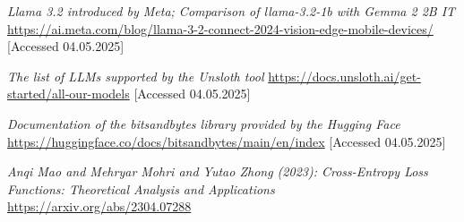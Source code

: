 \documentclass[licencjacka,en]{pracamgr}
\begin{document}
\begin{thebibliography}{99}
\textit{Llama 3.2 introduced by Meta; Comparison of llama-3.2-1b with Gemma 2 2B IT}
\url{https://ai.meta.com/blog/llama-3-2-connect-2024-vision-edge-mobile-devices/}
[Accessed 04.05.2025]

\textit{The list of LLMs supported by the Unsloth tool}
\url{https://docs.unsloth.ai/get-started/all-our-models}
[Accessed 04.05.2025]

\textit{Documentation of the bitsandbytes library provided by the Hugging Face}
\url{https://huggingface.co/docs/bitsandbytes/main/en/index}
[Accessed 04.05.2025]

\textit{Anqi Mao and Mehryar Mohri and Yutao Zhong (2023): Cross-Entropy Loss Functions: Theoretical Analysis and Applications}
\url{https://arxiv.org/abs/2304.07288}


\end{thebibliography}
\end{document}
